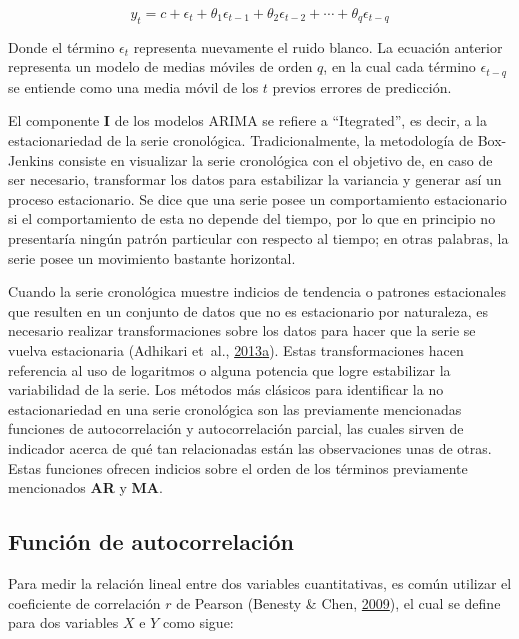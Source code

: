 \documentclass[]{article}
\begin{document}
\begin{equation}
y_t=c+\epsilon_t+\theta_1\epsilon_{t-1}+\theta_2\epsilon_{t-2}+\cdots+\theta_q\epsilon_{t-q}
\end{equation}

Donde el término \(\epsilon_t\) representa nuevamente el ruido blanco.
La ecuación anterior representa un modelo de medias móviles de orden
\(q\), en la cual cada término \(\epsilon_{t-q}\) se entiende como una
media móvil de los \(t\) previos errores de predicción.

El componente \textbf{I} de los modelos ARIMA se refiere a
``Itegrated'', es decir, a la estacionariedad de la serie cronológica.
Tradicionalmente, la metodología de Box-Jenkins consiste en visualizar
la serie cronológica con el objetivo de, en caso de ser necesario,
transformar los datos para estabilizar la variancia y generar así un
proceso estacionario. Se dice que una serie posee un comportamiento
estacionario si el comportamiento de esta no depende del tiempo, por lo
que en principio no presentaría ningún patrón particular con respecto al
tiempo; en otras palabras, la serie posee un movimiento bastante
horizontal.

Cuando la serie cronológica muestre indicios de tendencia o patrones
estacionales que resulten en un conjunto de datos que no es estacionario
por naturaleza, es necesario realizar transformaciones sobre los datos
para hacer que la serie se vuelva estacionaria (Adhikari et~al.,
\protect\hyperlink{ref-diferenciacion}{2013}\protect\hyperlink{ref-diferenciacion}{a}).
Estas transformaciones hacen referencia al uso de logaritmos o alguna
potencia que logre estabilizar la variabilidad de la serie. Los métodos
más clásicos para identificar la no estacionariedad en una serie
cronológica son las previamente mencionadas funciones de autocorrelación
y autocorrelación parcial, las cuales sirven de indicador acerca de qué
tan relacionadas están las observaciones unas de otras. Estas funciones
ofrecen indicios sobre el orden de los términos previamente mencionados
\textbf{AR} y \textbf{MA}.

\subsection{Función de autocorrelación}

Para medir la relación lineal entre dos variables cuantitativas, es
común utilizar el coeficiente de correlación \(r\) de Pearson (Benesty
\& Chen, \protect\hyperlink{ref-pearson}{2009}), el cual se define para
dos variables \(X\) e \(Y\) como sigue:
\end{document}
